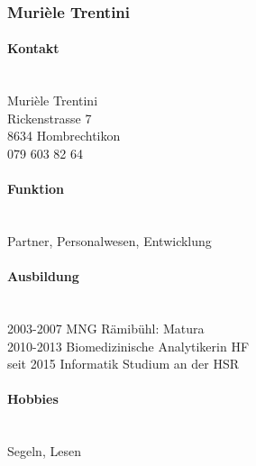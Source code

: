 \subsubsection{Murièle Trentini}
\noindent\begin{minipage}{0.7\textwidth}
	\paragraph{Kontakt} \hfill \\
	Murièle Trentini \\
	Rickenstrasse 7 \\
	8634 Hombrechtikon \\
	079 603 82 64 \\
	
	\paragraph{Funktion} \hfill \\
	Partner, Personalwesen, Entwicklung \\
	
	\paragraph{Ausbildung} \hfill \\
	2003-2007 \hspace{2cm} MNG Rämibühl: Matura \\
	2010-2013 \hspace{2cm} Biomedizinische Analytikerin HF \\
	seit 2015\hspace{2.3cm} Informatik Studium an der HSR\\
	
	\paragraph{Hobbies} \hfill \\
	Segeln, Lesen \\
\end{minipage}
\hfill
